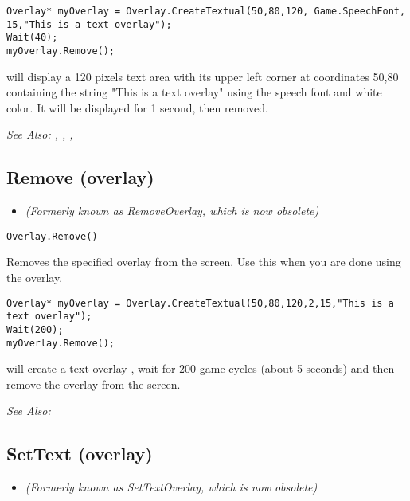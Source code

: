 \begin{verbatim}
Overlay* myOverlay = Overlay.CreateTextual(50,80,120, Game.SpeechFont, 15,"This is a text overlay");
Wait(40);
myOverlay.Remove();
\end{verbatim}
will display a 120 pixels text area with its upper left corner at coordinates 50,80
containing the string "This is a text overlay" using the speech font and white color.
It will be displayed for 1 second, then removed.

\it{See Also:} , ,
, 


\subsection{Remove (overlay)}\label{Overlay.Remove}%

\begin{itemize}
\item \it{(Formerly known as RemoveOverlay, which is now obsolete)}
\end{itemize}

\begin{verbatim}
Overlay.Remove()
\end{verbatim}
Removes the specified overlay from the screen. Use this when you are
done using the overlay.

\begin{verbatim}
Overlay* myOverlay = Overlay.CreateTextual(50,80,120,2,15,"This is a text overlay");
Wait(200);
myOverlay.Remove();
\end{verbatim}
will create a text overlay , wait for 200 game cycles (about 5 seconds) and then
remove the overlay from the screen.

\it{See Also:} 


\subsection{SetText (overlay)}\label{Overlay.SetText}%

\begin{itemize}
\item \it{(Formerly known as SetTextOverlay, which is now obsolete)}
\end{itemize}

